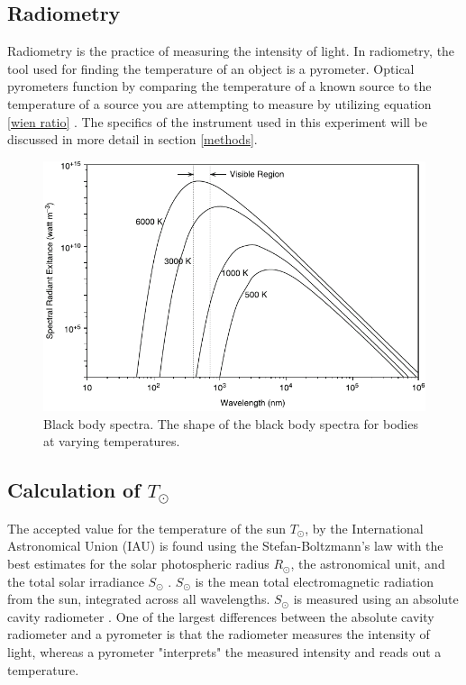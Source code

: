 \documentclass[%
 reprint,
 amsmath,amssymb,
 aps,
 10pt
]{revtex4-2}
\begin{document}
\subsection{Radiometry}
Radiometry is the practice of measuring the intensity of light. In radiometry, the tool used for finding the temperature of an object is a pyrometer. Optical pyrometers function by comparing the temperature of a known source to the temperature of a source you are attempting to measure by utilizing equation \ref{wien ratio} \citep{gilchrist_fuels_1977}. The specifics of the instrument used in this experiment will be discussed in more detail in section \ref{methods}.
\par
\begin{figure}
	\includegraphics{blackbody.pdf}
	\caption{\label{blackbody spectra} Black body spectra. The shape of the black body spectra for bodies at varying temperatures.
	\citep{luo_blackbody_2015} }
\end{figure}
\subsection{Calculation of $T_\odot$}
The accepted value for the temperature of the sun $T_\odot$, by the International Astronomical Union (IAU) is found using the Stefan-Boltzmann's law with the best estimates for the solar photospheric radius $R_\odot$, the astronomical unit, and the total solar irradiance $S_\odot$ \citep{prsa_nominal_2016}
. $S_\odot$ is the mean total electromagnetic radiation from the sun, integrated across all wavelengths. $S_\odot$ is measured using an absolute cavity radiometer \citep{kendall_primary_1969}. One of the largest differences between the absolute cavity radiometer and a pyrometer is that the radiometer measures the intensity of light, whereas a pyrometer "interprets" the measured intensity and reads out a temperature.
\end{document}
